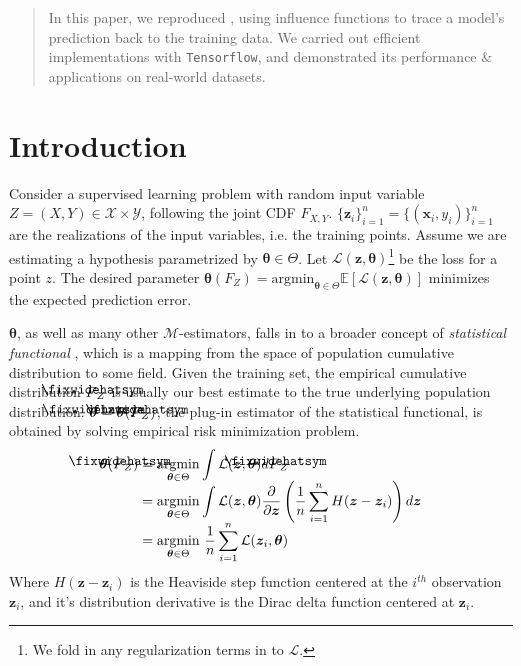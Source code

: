 \documentclass{article}
\newcommand\lowerwidehatsym{%
  \text{\smash{\raisebox{-1.3ex}{%
    $\fixwidehatsym$}}}}
\newcommand\fixwidehat[1]{%
  \mathchoice
    {\accentset{\displaystyle\lowerwidehatsym}{#1}}
    {\accentset{\textstyle\lowerwidehatsym}{#1}}
    {\accentset{\scriptstyle\lowerwidehatsym}{#1}}
    {\accentset{\scriptscriptstyle\lowerwidehatsym}{#1}}
}
\begin{document}
\begin{abstract} 
In this paper, we reproduced \cite{koh2017}, using influence functions to trace a model’s prediction back to the training data. We carried out efficient implementations with \texttt{Tensorflow}, and demonstrated its performance \& applications on real-world datasets. 
\end{abstract} 
\section{Introduction}
\label{intro}

Consider a supervised learning problem with random input variable $Z=(X,Y)\in \mathcal{X}\times \mathcal{Y}$, following the joint CDF $F_{X,Y}$. $\{\bm{z}_i\}_{i=1}^n = \{(\bm{x}_i, y_i)\}_{i=1}^n$ are the realizations of the input variables, i.e. the training points. Assume we are estimating a hypothesis parametrized by $\bm{\theta} \in \Theta$. Let $\mathcal{L}(\bm{z}, \bm{\theta})$\footnote{We fold in any regularization terms in to $\mathcal{L}$.} be the loss for a point $z$. The desired parameter $\bm{\theta}(F_Z)=\mathrm{argmin}_{\bm{\theta} \in \Theta}\mathbb{E}\left[\mathcal{L}(\bm{z},\bm{\theta})\right]$ minimizes the expected prediction error. 

$\bm{\theta}$, as well as many other $\mathcal{M}$-estimators, falls in to a broader concept of \textit{statistical functional} \cite{nonp}, which is a mapping from the space of population cumulative distribution to some field. Given the training set, the empirical cumulative distribution $\fixwidehat{F}_Z$ is usually our best estimate to the true underlying population distribution. $\fixwidehat{\bm{\theta}} = \bm{\theta}(\fixwidehat{F}_Z)$, the plug-in estimator of the statistical functional, is obtained by solving empirical risk minimization problem.
\begin{align}\label{emprisk}
	\bm{\theta}(\fixwidehat{F}_Z)&=\underset{\bm{\theta} \in \Theta}{\mathrm{argmin}}\int\mathcal{L}(\bm{z},\bm{\theta})d\fixwidehat{F}_Z \notag\\[-5pt]
	&=\underset{\bm{\theta} \in \Theta}{\mathrm{argmin}}\int\mathcal{L}(\bm{z},	\bm{\theta})\frac{\partial}{\partial \bm{z}}\left(\frac{1}{n}\sum_{i=1}^n H(\bm{z}-\bm{z}_i)\right) d \bm{z}\notag\\[-5pt]
	&=\underset{\bm{\theta} \in \Theta}{\mathrm{argmin}}~\frac{1}{n}\sum_{i=1}^n\mathcal{L}(\bm{z}_i,\bm{\theta})
\end{align}
Where $H(\bm{z}-\bm{z}_i)$ is the Heaviside step function centered at the $i^{th}$ observation $\bm{z}_i$, and it's distribution derivative is the Dirac delta function centered at $\bm{z}_i$. 
\end{document}
